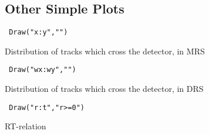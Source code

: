 \documentclass[a4paper,12pt]{article}
\begin{document}
\begin{appendix}
\subsection{Other Simple Plots}

\begin{verbatim} Draw("x:y","") \end{verbatim} Distribution of tracks which cross the detector, in MRS \\
\begin{verbatim} Draw("wx:wy","") \end{verbatim} Distribution of tracks which cross the detector, in DRS \\
\begin{verbatim} Draw("r:t","r>=0") \end{verbatim} RT-relation

\end{appendix}
\end{document}
